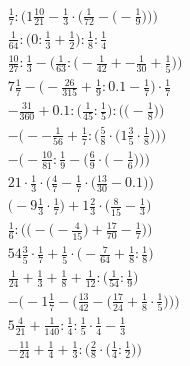 \documentclass[8pt]{article}
\begin{document}
\begin{align}
\frac{1}{7} : \bigg(1\frac{10}{21} - \frac{1}{3} \cdot \Big(\frac{1}{72} - \big(-\frac{1}{9}\big)\Big)\bigg) \\
\frac{1}{64} : \big(0 : \frac{1}{3} + \frac{1}{2}\big) : \frac{1}{8} : \frac{1}{4} \\
\frac{10}{27} : \frac{1}{3} - \Big(\frac{1}{63} : \big(-\frac{1}{42} + -\frac{1}{30} + \frac{1}{5}\big)\Big) \\
7\frac{1}{7} - \big(-\frac{26}{315} + \frac{1}{9} : 0.1 - \frac{1}{7}\big) \cdot \frac{1}{7} \\
-\frac{31}{360} + 0.1 : \Big(\frac{1}{45} : \frac{1}{5}\Big) : \Big(\big(-\frac{1}{8}\big)\Big) \\
-\bigg(--\frac{1}{56} + \frac{1}{7} : \Big(\frac{5}{8} \cdot \big(1\frac{3}{5} \cdot \frac{1}{8}\big)\Big)\bigg) \\
-\bigg(-\frac{10}{81} : \frac{1}{9} - \Big(\frac{6}{9} \cdot \big(-\frac{1}{6}\big)\Big)\bigg) \\
21 \cdot \frac{1}{3} \cdot \Big(\frac{4}{7} - \frac{1}{7} \cdot \big(\frac{13}{30} - 0.1\big)\Big) \\
\big(-9\frac{1}{3} \cdot \frac{1}{7}\big) + 1\frac{2}{3} \cdot \big(\frac{8}{15} - \frac{1}{3}\big) \\
\frac{1}{6} : \bigg(\Big(-\big(-\frac{4}{15}\big) + \frac{17}{70} - \frac{1}{7}\Big)\bigg) \\
54\frac{3}{5} \cdot \frac{1}{7} + \frac{1}{5} \cdot \big(-\frac{7}{64} + \frac{1}{8} : \frac{1}{8}\big) \\
\frac{1}{24} + \frac{1}{3} + \frac{1}{8} + \frac{1}{12} : \big(\frac{1}{54} : \frac{1}{9}\big) \\
-\bigg(-1\frac{1}{7} - \Big(\frac{13}{42} - \big(\frac{17}{24} + \frac{1}{8} \cdot \frac{1}{5}\big)\Big)\bigg) \\
5\frac{4}{21} + \frac{1}{140} : \frac{1}{4} : \frac{1}{5} \cdot \frac{1}{4} - \frac{1}{3} \\
-\frac{11}{24} + \frac{1}{4} + \frac{1}{3} : \Big(\frac{2}{8} \cdot \big(\frac{1}{4} : \frac{1}{2}\big)\Big)
\end{align}
\end{document}
